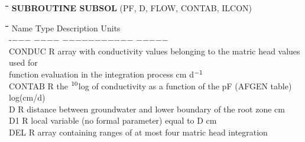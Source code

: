\bigskip
\bigskip
\bigskip
\nwln
\begin{tabbing}
\hspace{1.27cm}\=\hspace{1.27cm}\=\hspace{1.27cm}\=\hspace{1.27cm}\=%
\hspace{1.27cm}\=\hspace{1.27cm}\=\hspace{1.27cm}\=\hspace{1.27cm}\=%
\hspace{1.27cm}\=\hspace{1.27cm}\=\kill
{\bf SUBROUTINE SUBSOL} \> \> \> (PF, D, FLOW, CONTAB, ILCON)
\end{tabbing}
\nwln
\begin{tabbing}
\hspace{1.27cm}\=\hspace{1.27cm}\=\hspace{1.27cm}\=\hspace{1.27cm}\=%
\hspace{1.27cm}\=\hspace{1.27cm}\=\hspace{1.27cm}\=\hspace{1.27cm}\=%
\hspace{1.27cm}\=\hspace{1.27cm}\=\kill
Name    \> \> Type   \> Description                                        \> \> \> \> \> \> \> Units\\
-$-$$-$$-$    \> \> $-$$-$$-$$-$   \> $-$$-$$-$$-$$-$$-$$-$$-$$-$$-$$-$                                       \> \> \> \> \> \> \> $-$$-$$-$$-$$-$\\
CONDUC  \> \> R   \> array with conductivity values belonging to the matric head values used for \\
\>\> \> function evaluation in the integration process              \> \> \> \> \> \> \> cm d$^{{\rm -1}}$\\
CONTAB  \> \> R   \> the $^{{\rm 10}}$log of conductivity as a function of the pF (AFGEN table)    \> \> \> \> \> \> \> log(cm/d)\\
D       \> \> R   \> distance between groundwater and lower boundary of the root zone      \> \> \> \> \> \> \> cm\\
D1      \> \> R   \> local variable (no formal parameter) equal to D    \> \> \> \> \> \> \> cm\\
DEL     \> \> R   \> array containing ranges of at most four matric head integration \\
$$
\end{tabbing}
